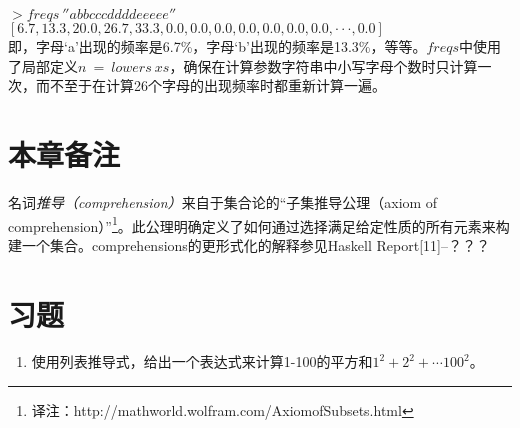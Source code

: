 \noindent\hspace*{1cm}$>freqs~''abbcccddddeeeee''$\\
\hspace*{1cm}$[6.7, 13.3, 20.0, 26.7, 33.3, 0.0, 0.0, 0.0, 0.0, 0.0, 0.0, 0.0, · · · , 0.0]$\\

即，字母‘a’出现的频率是6.7\%，字母‘b’出现的频率是13.3\%，等等。$freqs$中使用了局部定义$n~=~lowers~xs$，确保在计算参数字符串中小写字母个数时只计算一次，而不至于在计算26个字母的出现频率时都重新计算一遍。

\section{本章备注}
名词\textit{推导（comprehension）}来自于集合论的“子集推导公理（axiom of comprehension）”\footnote{译注：http://mathworld.wolfram.com/AxiomofSubsets.html}。此公理明确定义了如何通过选择满足给定性质的所有元素来构建一个集合。comprehensions的更形式化的解释参见Haskell Report[11]--？？？

\section{习题}

\begin{enumerate}
  \item 使用列表推导式，给出一个表达式来计算1-100的平方和$1^2 + 2^2 +\cdots 100^2$。
\end{enumerate}






